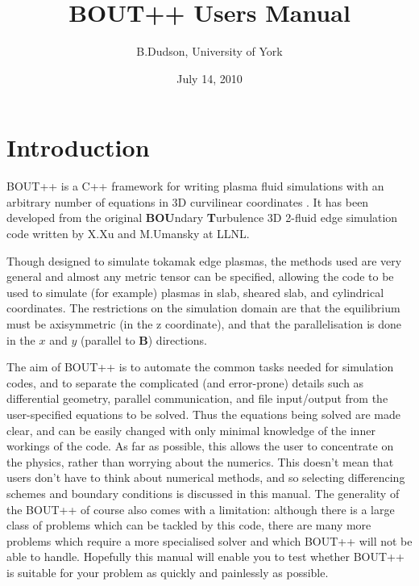 \documentclass[12pt]{article}
\begin{document}
\title{BOUT++ Users Manual}
\author{B.Dudson, University of York}
\date{July 14, 2010}
\maketitle

\tableofcontents

\section{Introduction}

BOUT++ is a C++ framework for writing plasma fluid simulations with an arbitrary number of equations
in 3D curvilinear coordinates \cite{Dudson2009,dudson-2008-arxiv}. It has been developed from the original {\bf BOU}ndary {\bf T}urbulence
3D 2-fluid edge simulation code \cite{bout_manual,umansky-2008-bout,xu-2008} written by X.Xu and M.Umansky at LLNL.

Though designed to simulate tokamak edge plasmas, the methods used are very general and almost
any metric tensor can be specified, allowing the code to be used to simulate (for example) plasmas in 
slab, sheared slab, and cylindrical coordinates. The restrictions on the simulation domain
are that the equilibrium must be axisymmetric (in the z coordinate), and that the parallelisation
is done in the $x$ and $y$ (parallel to $\mathbf{B}$) directions.

The aim of BOUT++ is to automate the common tasks needed for simulation codes, and to separate the
complicated (and error-prone) details such as differential geometry, parallel communication, and
file input/output from the user-specified equations to be solved. Thus the equations being solved
are made clear, and can be easily changed with only minimal knowledge of the inner workings of the
code. As far as possible, this allows the user to concentrate on the physics, rather than worrying
about the numerics. This doesn't mean that users don't have to think about numerical methods, and so selecting differencing schemes and boundary conditions is discussed in this manual. The generality of the BOUT++ of course also comes with a limitation: although there is a large class of problems which can be tackled by this code, there are many more problems which require a more specialised solver and which BOUT++ will not be able to handle. Hopefully this manual will enable you to test whether BOUT++ is suitable for your problem as quickly and painlessly as possible.
\end{document}

